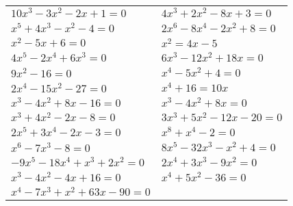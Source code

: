 \documentclass[12pt,a4paper]{article}
\begin{document}
\begin{enumerate}[1.]
\begin{enumerate}[1)]
\begin{tabular}{p{7cm} p{7cm}}
				\item $10x^3-3x^2-2x+1=0 $& \item $4x^3+2x^2-8x+3=0 $ \\
				\item $x^5+4x^3-x^2-4=0 $& \item $2x^6-8x^4-2x^2+8=0 $ \\
				\item $x^2 - 5x + 6 = 0$ & \item $x^2 = 4x - 5 $\\
				\item $4x^5 - 2x^4 + 6x^3=0$ & \item $6x^3 -12x^2+18x=0 $\\
				\item $9x^2-16=0 $& \item $x^4-5x^2+4=0 $\\
				\item $2x^4-15x^2-27=0 $ & \item $x^4+16=10x $\\
				\item $x^3-4x^2+8x-16=0 $ & \item $x^3-4x^2+8x=0 $\\
				\item $x^3+4x^2-2x-8=0 $ & \item $3x^3+5x^2-12x-20=0 $\\
				\item $2x^5+3x^4-2x-3=0 $ & \item $x^8+x^4-2=0 $\\
				\item $x^6-7x^3-8=0 $ &	\item $8x^5-32x^3-x^2+4=0 $\\
				\item $-9x^5-18x^4+x^3+2x^2=0 $ & \item $2x^4+3x^3-9x^2=0$\\
				\item $x^3-4x^2-4x+16=0$ & \item $x^4+5x^2-36=0$\\
				\item $x^4-7x^3+x^2+63x-90=0$ \\
				\end{tabular} \end{enumerate}
	\end{enumerate}
\end{document}

